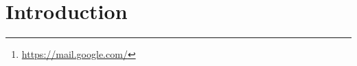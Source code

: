 \documentclass[a4paper,11pt,openany]{report}
\begin{document}
\begin{abstract}
  In a second part, we focused our attention on concrete applications of CSRF vulnerabilities. 
  Lots of companies were affected in the past and we decided to deal with Google well-known 
  stories about CSRF. Indeed, 2 different vulnerabilities were discovered in 2007 concerning 
  Gmail \footnote{\url{https://mail.google.com/}} email service.
  
  Finally, we implemented a small webapp with different services, either vulnerable or protected 
  from CSRF attack. This webapp associated with an attacker website, both developped from scratch, 
  outline different practical examples of the attack and different ways to prevent it.
  \end{abstract}
  

\tableofcontents{} %
\clearpage %
\setcounter{page}{1} %

  

  \section{Introduction}
  
\end{document}
